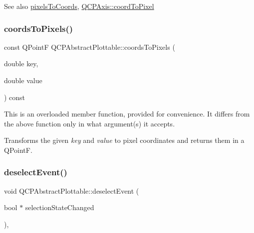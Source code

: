 \begin{DoxySeeAlso}{See also}
\mbox{\hyperlink{class_q_c_p_abstract_plottable_a3903c1120ab5c27e7fa46b597ef267bd}{pixels\+To\+Coords}}, \mbox{\hyperlink{class_q_c_p_axis_af15d1b3a7f7e9b53d759d3ccff1fe4b4}{Q\+C\+P\+Axis\+::coord\+To\+Pixel}} 
\end{DoxySeeAlso}
\mbox{\label{class_q_c_p_abstract_plottable_a5acb50ae984eef09a7ab92315d2ad708}} 
\subsubsection{\texorpdfstring{coordsToPixels()}{coordsToPixels()}\hspace{0.1cm}{\footnotesize\ttfamily [2/2]}}
{\footnotesize\ttfamily const Q\+PointF Q\+C\+P\+Abstract\+Plottable\+::coords\+To\+Pixels (\begin{DoxyParamCaption}\item[{double}]{key,  }\item[{double}]{value }\end{DoxyParamCaption}) const}

This is an overloaded member function, provided for convenience. It differs from the above function only in what argument(s) it accepts.

Transforms the given {\itshape key} and {\itshape value} to pixel coordinates and returns them in a Q\+PointF. \mbox{\label{class_q_c_p_abstract_plottable_a9b104d9da4f38f934363945c313bf82e}} 
\subsubsection{\texorpdfstring{deselectEvent()}{deselectEvent()}}
{\footnotesize\ttfamily void Q\+C\+P\+Abstract\+Plottable\+::deselect\+Event (\begin{DoxyParamCaption}\item[{bool $\ast$}]{selection\+State\+Changed }\end{DoxyParamCaption})\hspace{0.3cm}{\ttfamily [protected]}, {\ttfamily [virtual]}}



